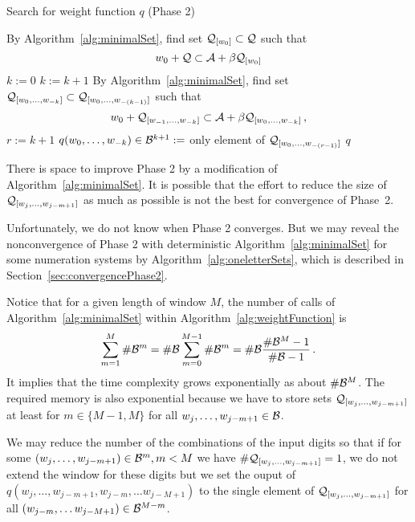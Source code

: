     
\begin{algorithm}
  \caption{Search for weight function $q$ (Phase 2)}
    \label{alg:weightFunction}
  \begin{algorithmic}[1]
        \STATE By Algorithm~\ref{alg:minimalSet}, find set $\mathcal{Q}_{[w_0]} \subset \mathcal{Q}$ such that
          $$
          w_0 + \mathcal{Q} \subset \mathcal{A} + \beta \mathcal{Q}_{[w_0]}
          $$
    \ENDFOR
    \STATE $k:=0$
        \STATE $k:= k +1$
            \STATE By Algorithm~\ref{alg:minimalSet}, find set $\mathcal{Q}_{[w_{0}, \dots, w_{-k}]} \subset \mathcal{Q}_{[w_{0}, \dots, w_{-(k-1)}]}$ such that
              $$
              w_0 + \mathcal{Q}_{[w_{-1}, \dots, w_{-k}]} \subset \mathcal{A} + \beta \mathcal{Q}_{[w_{0}, \dots, w_{-k}]}\,,
              $$
        \ENDFOR  
    \ENDWHILE  
    \STATE $r:= k+1$ 
        \STATE $q(w_{0}, \dots, w_{-k})\in \mathcal{B}^{k+1}:=$ only element of $\mathcal{Q}_{[w_{0}, \dots, w_{-(r-1)}]}$
    \ENDFOR
    \RETURN $q$
  \end{algorithmic}
\end{algorithm}
    
\begin{upravit} 

There is space to improve Phase 2 by a modification of Algorithm~\ref{alg:minimalSet}. It is possible that the effort to reduce the size of  $\mathcal{Q}_{[w_j,\dots, w_{j-m+1}]}$ as much as possible is not the best for convergence of Phase~2.

Unfortunately, we do not know when Phase 2 converges. But  we may reveal the nonconvergence of Phase 2 with deterministic Algorithm~\ref{alg:minimalSet} for some numeration systems by Algorithm~\ref{alg:oneletterSets}, which is described in Section~\ref{sec:convergencePhase2}.



Notice that for a given length of window $M$, the number of calls of Algorithm~\ref{alg:minimalSet} within Algorithm~\ref{alg:weightFunction} is
$$
\sum_{m=1}^M  \#\mathcal{B}^m = \#\mathcal{B} \sum_{m=0}^{M-1}  \#\mathcal{B}^m = \#\mathcal{B} \frac{\#\mathcal{B}^M-1}{\#\mathcal{B}-1}\,.
$$    
It implies that the time complexity grows exponentially as about $\#\mathcal{B}^M$. The required memory is also exponential because we have to store sets $\mathcal{Q}_{[w_j,\dots, w_{j-m+1}]}$ at least for $m\in\{M-1,M\}$  for all $w_j,\dots, w_{j-m+1} \in \mathcal{B}$.

We may reduce the number of the combinations of the input digits so that if for some $(w_j,\dots, w_{j-m+1})\in\mathcal{B}^m, m<M$ we have   $\#\mathcal{Q}_{[w_j,\dots, w_{j-m+1}]}=1$, we do not extend the window for these digits but we set the ouput of $q(w_j,\dots, w_{j-m+1}, w_{j-m}, \dots w_{j-M+1})$ to the single element of $\mathcal{Q}_{[w_j,\dots, w_{j-m+1}]}$ for all $(w_{j-m}, \dots w_{j-M+1})\in \mathcal{B}^{M-m}$. 
\end{upravit}